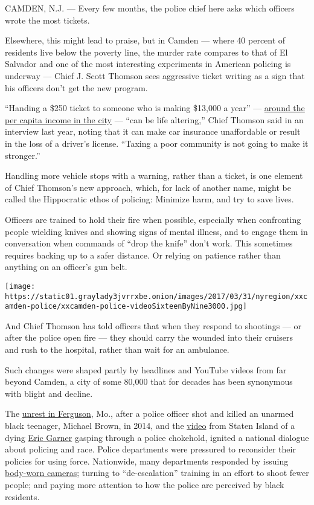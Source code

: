 CAMDEN, N.J. --- Every few months, the police chief here asks which
officers wrote the most tickets.

Elsewhere, this might lead to praise, but in Camden --- where 40 percent
of residents live below the poverty line, the murder rate compares to
that of El Salvador and one of the most interesting experiments in
American policing is underway --- Chief J. Scott Thomson sees aggressive
ticket writing as a sign that his officers don't get the new program.

``Handing a \$250 ticket to someone who is making \$13,000 a year'' ---
\href{https://www.census.gov/quickfacts/table/PST045216/3410000/accessible}{around
the per capita income in the city} --- ``can be life altering,'' Chief
Thomson said in an interview last year, noting that it can make car
insurance unaffordable or result in the loss of a driver's license.
``Taxing a poor community is not going to make it stronger.''

Handling more vehicle stops with a warning, rather than a ticket, is one
element of Chief Thomson's new approach, which, for lack of another
name, might be called the Hippocratic ethos of policing: Minimize harm,
and try to save lives.

Officers are trained to hold their fire when possible, especially when
confronting people wielding knives and showing signs of mental illness,
and to engage them in conversation when commands of ``drop the knife''
don't work. This sometimes requires backing up to a safer distance. Or
relying on patience rather than anything on an officer's gun belt.

\texttt{[image: https://static01.graylady3jvrrxbe.onion/images/2017/03/31/nyregion/xxcamden-police/xxcamden-police-videoSixteenByNine3000.jpg]}

And Chief Thomson has told officers that when they respond to shootings
--- or after the police open fire --- they should carry the wounded into
their cruisers and rush to the hospital, rather than wait for an
ambulance.

Such changes were shaped partly by headlines and YouTube videos from far
beyond Camden, a city of some 80,000 that for decades has been
synonymous with blight and decline.

The
\href{https://www.nytimes3xbfgragh.onion/interactive/2014/08/13/us/ferguson-missouri-town-under-siege-after-police-shooting.html?_r=0}{unrest
in Ferguson}, Mo., after a police officer shot and killed an unarmed
black teenager, Michael Brown, in 2014, and the
\href{https://www.youtube.com/watch?v=LfXqYwyzQpM}{video} from Staten
Island of a dying
\href{https://www.nytimes3xbfgragh.onion/2015/06/14/nyregion/eric-garner-police-chokehold-staten-island.html}{Eric
Garner} gasping through a police chokehold, ignited a national dialogue
about policing and race. Police departments were pressured to reconsider
their policies for using force. Nationwide, many departments responded
by issuing \href{100000004995144/web/editing}{body-worn cameras};
turning to ``de-escalation'' training in an effort to shoot fewer
people; and paying more attention to how the police are perceived by
black residents.

